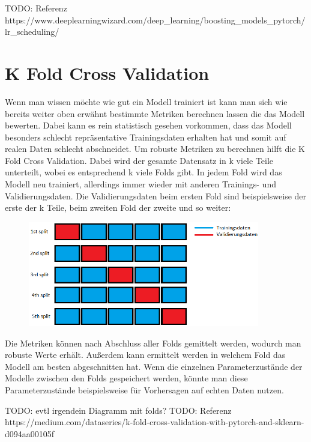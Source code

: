\documentclass[11pt, a4paper]{article}
\begin{document}
TODO: Referenz https://www.deeplearningwizard.com/deep_learning/boosting_models_pytorch/lr_scheduling/

\section{K Fold Cross Validation}
Wenn man wissen möchte wie gut ein Modell trainiert ist kann man sich wie bereits weiter oben erwähnt bestimmte Metriken berechnen lassen die das Modell bewerten. Dabei kann es rein statistisch gesehen vorkommen, dass das Modell besonders schlecht repräsentative Trainingsdaten erhalten hat und somit auf realen Daten schlecht abschneidet. Um robuste Metriken zu berechnen hilft die K Fold Cross Validation. Dabei wird der gesamte Datensatz in k viele Teile unterteilt, wobei es entsprechend k viele Folds gibt. In jedem Fold wird das Modell neu trainiert, allerdings immer wieder mit anderen Trainings- und Validierungsdaten. Die Validierungsdaten beim ersten Fold sind beispielsweise der erste der k Teile, beim zweiten Fold der zweite und so weiter:
\begin{figure}[h]
\centering
\includegraphics[width=0.9\textwidth]{folds.png}
\end{figure}
Die Metriken können nach Abschluss aller Folds gemittelt werden, wodurch man robuste Werte erhält. Außerdem kann ermittelt werden in welchem Fold das Modell am besten abgeschnitten hat. Wenn die einzelnen Parameterzustände der Modelle zwischen den Folds gespeichert werden, könnte man diese Parameterzustände beispielsweise für Vorhersagen auf echten Daten nutzen.

TODO: evtl irgendein Diagramm mit folds?
TODO: Referenz https://medium.com/dataseries/k-fold-cross-validation-with-pytorch-and-sklearn-d094aa00105f
\end{document}
